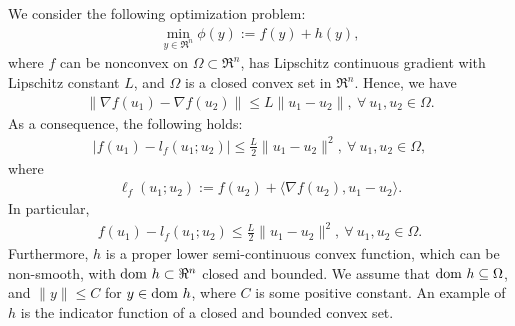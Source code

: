 \documentclass[11pt]{article}
\begin{document}
We consider the following optimization problem:
\begin{eqnarray}\label{CNO}
\min_{y \in \Re^n}\phi(y) := f(y) + h(y),
\end{eqnarray}
where $f$ can be nonconvex on $\Omega \subset \Re^n$, has Lipschitz continuous gradient with Lipschitz constant $L$, and $\Omega$ is a closed convex set in $\Re^n$.  Hence,  we have
\begin{eqnarray*}%
\| \nabla f(u_1) - \nabla f(u_2) \| \leq L \|u_1 - u_2\|,\ \forall\ u_1, u_2 \in \Omega.
\end{eqnarray*}
As a consequence, the following holds: 
\begin{eqnarray}\label{ineq:lipschitzconsequence}
| f(u_1) - l_f(u_1; u_2) | \leq \frac{L}{2} \| u_1 - u_2 \|^2, \ \forall\ u_1, u_2 \in \Omega,
\end{eqnarray}
where
\begin{eqnarray*}%
\ell_f(u_1;u_2) := f(u_2) + \langle \nabla f(u_2), u_1 - u_2 \rangle.
\end{eqnarray*}
In particular,
\begin{eqnarray}\label{ineq:upperlipschitzconsequence}
f(u_1) - l_f(u_1; u_2)  \leq \frac{L}{2} \| u_1 - u_2 \|^2, \ \forall\ u_1, u_2 \in \Omega.
\end{eqnarray}
Furthermore, $h$ is a proper lower semi-continuous convex function, which can be non-smooth, with ${\rm{dom}}\ h \subset \Re^n$ closed and bounded.  We assume that ${\rm{dom}}\ h \subseteq \Omega$, and $\| y \| \leq C$ for $y \in {\rm{dom}}\ h$, where $C$ is some positive constant.  An example of $h$ is the indicator function of a closed and bounded convex set.
%
%
%
\vspace{10pt}
\end{document}

